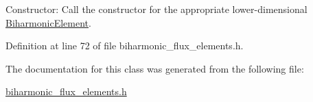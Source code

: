Constructor\+: Call the constructor for the appropriate lower-\/dimensional \hyperlink{classoomph_1_1BiharmonicElement}{Biharmonic\+Element}. 



Definition at line 72 of file biharmonic\+\_\+flux\+\_\+elements.\+h.



The documentation for this class was generated from the following file\+:\begin{DoxyCompactItemize}
\item 
\hyperlink{biharmonic__flux__elements_8h}{biharmonic\+\_\+flux\+\_\+elements.\+h}\end{DoxyCompactItemize}
